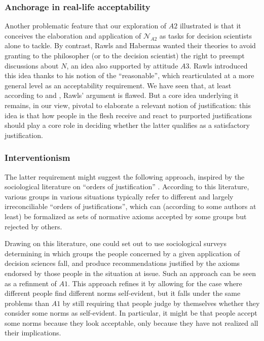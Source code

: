\documentclass[preprint, french, english, 11pt, authoryear]{elsarticle}%
\begin{document}
\subsubsection{Anchorage in real-life acceptability}
Another problematic feature that our exploration of $A2$ illustrated is that it conceives the elaboration and application of $\mathscr{N}_{A2}$ as tasks for decision scientists alone to tackle. By contrast, Rawls and Habermas wanted their theories to avoid granting to the philosopher (or to the decision scientist) the right to preempt discussions about $N$, an idea also supported by attitude $A3$. Rawls introduced this idea thanks to his notion of the ``reasonable'', which \cite{estlund_democratic_2009} rearticulated at a more general level as an acceptability requirement. We have seen that, at least according to \cite{habermas_reconciliation_1995} and \cite{estlund_democratic_2009}, Rawls' argument is flawed. But a core idea underlying it remains, in our view, pivotal to elaborate a relevant notion of justification: this idea is that how people in the flesh receive and react to purported justifications should play a core role in deciding whether the latter qualifies as a satisfactory justification.

\subsubsection{Interventionism}
The latter requirement might suggest the following approach, inspired by the sociological literature on “orders of justification” \citep{boltanski_justification_2006}. According to this literature, various groups in various situations typically refer to different and largely irreconciliable “orders of justifications”, which can (according to some authors at least) be formalized as sets of normative axioms accepted by some groups but rejected by others.

Drawing on this literature, one could set out to use sociological surveys determining in which groups the people concerned by a given application of decision sciences fall, and produce recommendations justified by the axioms endorsed by those people in the situation at issue. Such an approach can be seen as a refinment of $A1$. This approach refines it by allowing for the case where different people find different norms self-evident, but it falls under the same problems than $A1$ by still requiring that people judge by themselves whether they consider some norms as self-evident. In particular, it might be that people accept some norms because they look acceptable, only because they have not realized all their implications.
\end{document}
